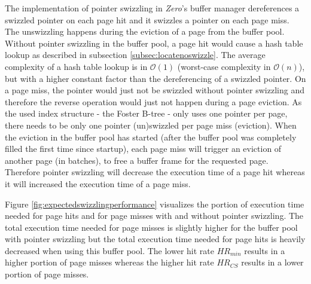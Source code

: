 	The implementation of pointer swizzling in \emph{Zero}'s buffer manager dereferences a swizzled pointer on each page hit and it swizzles a pointer on each page miss. The unswizzling happens during the eviction of a page from the buffer pool. Without pointer swizzling in the buffer pool, a page hit would cause a hash table lookup as described in subsection \ref{subsec:locatenoswizzle}. The average complexity of a hash table lookup is in $\mathcal{O}\left(1\right)$ (worst-case complexity in $\mathcal{O}\left(n\right)$), but with a higher constant factor than the dereferencing of a swizzled pointer. On a page miss, the pointer would just not be swizzled without pointer swizzling and therefore the reverse operation would just not happen during a page eviction. As the used index structure - the Foster B-tree - only uses one pointer per page, there needs to be only one pointer (un)swizzled per page miss (eviction). When the eviction in the buffer pool has started (after the buffer pool was completely filled the first time since startup), each page miss will trigger an eviction of another page (in batches), to free a buffer frame for the requested page. Therefore pointer swizzling will decrease the execution time of a page hit whereas it will increased the execution time of a page miss.
	
	Figure \ref{fig:expectedswizzlingperformance} visualizes the portion of execution time needed for page hits and for page misses with and without pointer swizzling. The total execution time needed for page misses is slightly higher for the buffer pool with pointer swizzling but the total execution time needed for page hits is heavily decreased when using this buffer pool. The lower hit rate $HR_{min}$ results in a higher portion of page misses whereas the higher hit rate $HR_{CS}$ results in a lower portion of page misses.
			
